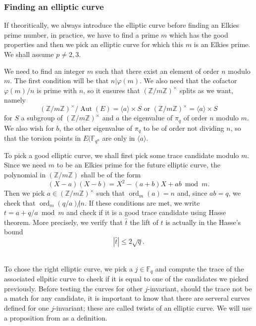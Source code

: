 \documentclass[12pt]{article}
\theoremstyle{plain}
\theoremstyle{definition}
\DeclareMathOperator{\order}{ord} %
\DeclareMathOperator{\Aut}{Aut}
\def\Z{\ensuremath{\mathbb{Z}}}
\def\F{\ensuremath{\mathbb{F}}}
\begin{document}
\subsubsection{Finding an elliptic curve}
If theoritically, we always introduce the elliptic curve before finding an
Elkies prime number, in practice, we have to find a prime $m$ which has the good
properties and then we pick an elliptic curve for which this $m$ is an Elkies
prime. We shall assume $p\neq2,3$.\par
We need to find an integer $m$ such that there exist an element of order $n$
modulo $m$. The first condition will be that $n|\varphi(m)$. We also need 
that the cofactor $\varphi(m)/n$ is prime with $n$, so it ensures that 
$(\Z/m\Z)^{\times}$ splits as we want, namely 
\begin{equation}
(\Z/m\Z)^{\times}/\Aut(E)=\langle{a}\rangle\times S \text{ or } 
(\Z/m\Z)^{\times}=\langle{a}\rangle\times S
\end{equation}
for $S$ a subgroup of $(\Z/m\Z)^{\times}$ and $a$ the eigenvalue of $\pi_q$ of
order $n$ modulo $m$. We also wish for $b$, the other eigenvalue of $\pi_q$ to
be of order not dividing $n$, so that the torsion points in $E(\F_{q^n}$ are
only in $\langle{a}\rangle$.\par
To pick a good elliptic curve, we shall first pick some trace candidate modulo 
$m$. Since we need $m$ to be an Elkies prime for the future elliptic curve, the
polynomial in $(\Z/m\Z)$ shall be of the form
\begin{equation}
(X - a)(X - b) = X^2 - (a + b)X + ab \bmod m.
\end{equation}
Then we pick $a\in(\Z/m\Z)^{\times}$ such that $\order_m(a) = n$ and,
since $ab = q$, we check that $\order_m(q/a)\not| n$. If these conditions are
met, we write $t = a + q/a \bmod m$ and check if it is a good trace candidate
using Hasse theorem. More precisely, we verify that $\widehat{t}$ the lift of $t$ is
actually in the Hasse's bound
\begin{equation}
|\widehat{t}| \leq 2\sqrt{q}.
\end{equation}\\\par
To chose the right elliptic curve, we pick a $j\in\F_q$ and compute the trace of
the associated ellpitic curve to check if it is equal to one of the candidates
we picked previously. Before testing the curves for other $j$-invariant, should
the trace not be a match for any candidate, it is important to know that there
are serveral curves defined for one $j$-invariant; these are called twists of an
elliptic curve. We will use a proposition from \cite{Silverman} as a
definition.
\end{document}
